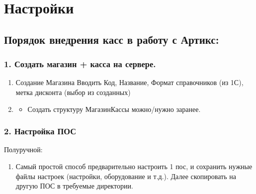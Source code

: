 \documentclass[letterpaper,10pt,russian]{sphinxmanual}
\begin{document}
\sphinxstepscope


\chapter{Настройки}
\label{\detokenize{setting:id1}}\label{\detokenize{setting::doc}}
\sphinxstepscope


\section{Порядок внедрения касс в работу с Артикс:}
\label{\detokenize{kass:id1}}\label{\detokenize{kass::doc}}

\subsection{1. Создать магазин + касса на сервере.}
\label{\detokenize{kass:id2}}\begin{enumerate}
%
\item {} 
\sphinxAtStartPar
Создание Магазина \sphinxhyphen{} Вводить Код, Название, Формат справочников (из 1С), метка дисконта (выбор из созданных)

\item {} \begin{description}
\begin{itemize}
\item {} 
\sphinxAtStartPar
Создать структуру Магазин\sphinxhyphen{}Кассы можно/нужно заранее.

\end{itemize}

\end{description}

\end{enumerate}


\subsection{2. Настройка ПОС}
\label{\detokenize{kass:id3}}
\sphinxAtStartPar
Полуручной:
\begin{enumerate}
%
\item {} 
\sphinxAtStartPar
Самый простой способ предварительно настроить 1 пос, и сохранить нужные файлы настроек (настройки, оборудование и т.д.). Далее скопировать на другую ПОС в требуемые директории.

\end{enumerate}
\end{document}
